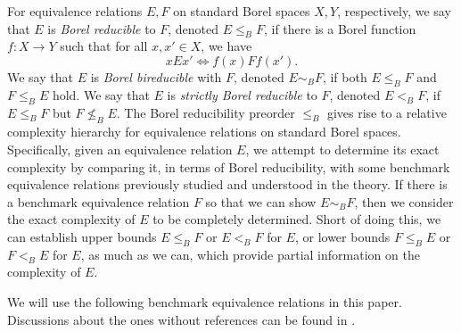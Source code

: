 \documentclass{amsart}
\theoremstyle{definition}
\theoremstyle{remark}
\begin{document}
For equivalence relations $E, F$ on standard Borel spaces $X, Y$, respectively, we say that $E$ is {\em Borel reducible} to $F$, denoted $E\leq_B F$, if there is a Borel function $f\colon X\to Y$ such that for all $x, x'\in X$, we have
$$ xEx'\iff f(x)Ff(x'). $$
We say that $E$ is {\em Borel bireducible} with $F$, denoted $E\sim_B F$, if both $E\leq_B F$ and $F\leq_B E$ hold. We say that $E$ is {\em strictly Borel reducible} to $F$, denoted $E<_B F$, if $E\leq_B F$ but $F\not\leq_B E$. The Borel reducibility preorder $\leq_B$ gives rise to a relative complexity hierarchy for equivalence relations on standard Borel spaces. Specifically, given an equivalence relation $E$, we attempt to determine its exact complexity by comparing it, in terms of Borel reducibility, with some benchmark equivalence relations previously studied  and understood in the theory. If there is a benchmark equivalence relation $F$ so that we can show $E\sim_B F$, then we consider the exact complexity of $E$ to be completely determined. Short of doing this, we can establish upper bounds $E\leq_B F$ or $E<_B F$ for $E$, or lower bounds $F\leq_B E$ or $F<_B E$ for $E$, as much as we can, which provide partial information on the complexity of $E$.

We will use the following benchmark equivalence relations in this paper. Discussions about the ones without references can be found in \cite{GaoBook}.
\end{document}
